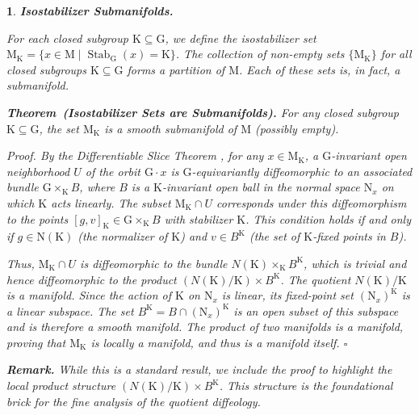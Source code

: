 \documentclass[10pt,reqno,letterpaper,twoside]{amsart}
\theoremstyle{article}
\newtheorem{article}{}
\def\artlabel[#1]{\textbf{#1.}}
\newenvironment{theorem}[1]%
{\noindent\textbf{Theorem#1.} \it}%
{}
\renewenvironment{proof}%
{\noindent\textit{Proof.}}%
{\nolinebreak\hfill $\square$}
\def \G{\mathrm G}
\def \K{\mathrm K}
\def \M{\mathrm M}
\def \N{\mathrm N}
\DeclareMathOperator{\Stab}{Stab}
\begin{document}
  \begin{article}
    \artlabel[Isostabilizer Submanifolds]
    \label{Isostabilizer_Submanifolds}
    
    For each closed subgroup $\K \subseteq \G$,
    we define the \emph{isostabilizer set} $\M_\K = \{x \in \M \mid \Stab_\G(x) = \K\}$.
    The collection of non-empty sets $\{\M_\K\}$ for all closed subgroups $\K \subseteq \G$ forms a partition of $\M$.
    Each of these sets is,
    in fact,
    a submanifold.
    
    \begin{theorem}{~(Isostabilizer Sets are Submanifolds)}
      \label{thm:MK_manifold}
      For any closed subgroup $\K \subseteq \G$,
      the set $\M_\K$ is a smooth submanifold of $\M$ (possibly empty).
    \end{theorem}
    
    \begin{proof}
      By the Differentiable Slice Theorem \cite{Pal60, Bre72},
      for any $x \in \M_\K$,
      a $\G$-invariant open neighborhood $U$ of the orbit $\G \cdot x$ is $\G$-equivariantly diffeomorphic to an associated bundle $\G \times_\K B$,
      where $B$ is a $\K$-invariant open ball in the normal space $\N_x$ on which $\K$ acts linearly.
      The subset $\M_\K \cap U$ corresponds under this diffeomorphism to the points $[g, v]_\K \in \G \times_\K B$ with stabilizer $\K$.
      This condition holds if and only if $g \in \N(\K)$ (the normalizer of $\K$) and $v \in B^\K$ (the set of $\K$-fixed points in $B$).
      
      Thus,
      $\M_\K \cap U$ is diffeomorphic to the bundle $N(\K) \times_\K B^\K$,
      which is trivial and hence diffeomorphic to the product $(N(\K)/\K) \times B^\K$.
      The quotient $N(\K)/\K$ is a manifold.
      Since the action of $\K$ on $\N_x$ is linear,
      its fixed-point set $(\N_x)^\K$ is a linear subspace.
      The set $B^\K = B \cap (\N_x)^\K$ is an open subset of this subspace and is therefore a smooth manifold.
      The product of two manifolds is a manifold,
      proving that $\M_\K$ is locally a manifold,
      and thus is a manifold itself.
    \end{proof}
    
    \textbf{Remark.}
    While this is a standard result,
    we include the proof to highlight the local product structure $(N(\K)/\K) \times B^\K$.
    This structure is the foundational brick for the fine analysis of the quotient diffeology.
    
  \end{article}
  
\end{document}
